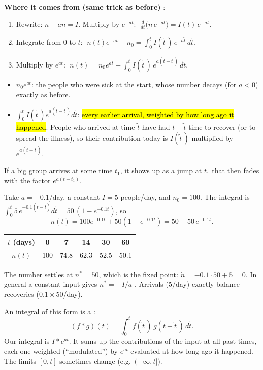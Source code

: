 \textbf{Where it comes from (same trick as before)} :
\begin{enumerate}
  \item Rewrite: $\dot n - an = I$. Multiply by $e^{-at}$: $\;\frac{d}{dt}\big(n\,e^{-at}\big) = I(t)\,e^{-at}$.
  \item Integrate from $0$ to $t$: $\;n(t)e^{-at} - n_0 = \int_0^t I(\tilde t\,)\,e^{-a\tilde t}\,d\tilde t$.
  \item Multiply by $e^{at}$: $\;n(t) = n_0e^{at} + \int_0^t I(\tilde t\,)\,e^{a(t-\tilde t\,)}\,d\tilde t$.
\end{enumerate}

\begin{intuition}
\begin{itemize}
  \item $n_0e^{at}$: the people who were sick at the start, whose number decays (for $a<0$) exactly as before.
  \item $\int_0^t I(\tilde t\,)e^{a(t-\tilde t\,)}d\tilde t$: \hl{every earlier arrival, weighted by how long ago it happened}.
        People who arrived at time $\tilde t$ have had $t-\tilde t$ time to recover (or to spread the illness), so their
        contribution today is $I(\tilde t\,)$ multiplied by $e^{a(t-\tilde t\,)}$.
\end{itemize}
If a big group arrives at some time $t_1$, it shows up as a jump at $t_1$ that then fades with the factor $e^{a(t-t_1)}$.
\end{intuition}

\begin{example}
Take $a=-0.1$/day, a constant $I=5$ people/day, and $n_0=100$. The integral is
$\int_0^t 5\,e^{-0.1(t-\tilde t)}d\tilde t = 50\,(1-e^{-0.1t})$, so
\[ n(t) = 100e^{-0.1t} + 50(1-e^{-0.1t}) = 50 + 50\,e^{-0.1t}. \]
\begin{center}
\begin{tabular}{c|ccccc}
$t$ (days) & 0 & 7 & 14 & 30 & 60\\\hline
$n(t)$ & 100 & 74.8 & 62.3 & 52.5 & 50.1
\end{tabular}
\end{center}
The number settles at $n^* = 50$, which is the fixed point: $\dot n = -0.1\cdot 50 + 5 = 0$. In general a constant input
gives $n^* = -I/a$ . Arrivals ($5$/day) exactly balance recoveries ($0.1\times50$/day).
\end{example}

\begin{defn}[Convolution]
An integral of this form is a :
\[ (f*g)(t) = \int_0^t f(\tilde t\,)\,g(t-\tilde t\,)\,d\tilde t. \]
Our integral is $I * e^{at}$. It sums up the contributions of the input at all past times, each one weighted (``modulated'')
by $e^{at}$ evaluated at how long ago it happened. The limits $[0,t]$ sometimes change (e.g.\ $(-\infty,t]$).
\end{defn}


